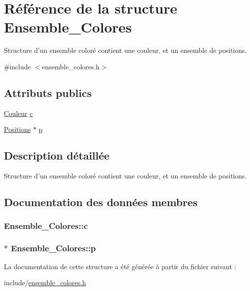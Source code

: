 \hypertarget{structEnsemble__Colores}{\section{\-Référence de la structure \-Ensemble\-\_\-\-Colores}
\label{structEnsemble__Colores}
}


\-Structure d'un ensemble coloré contient une couleur, et un ensemble de positions.  




{\ttfamily \#include $<$ensemble\-\_\-colores.\-h$>$}

\subsection*{\-Attributs publics}
\begin{DoxyCompactItemize}
\item 
\hyperlink{couleur_8h_aa304d0ca681f782b1d7735da33037dd7}{\-Couleur} \hyperlink{structEnsemble__Colores_ac6e238df5b4b896d72d3a54bceb3502b}{c}
\item 
\hyperlink{positions_8h_abfec3f4df359d071393d062f4aa9bf82}{\-Positions} $\ast$ \hyperlink{structEnsemble__Colores_ade944f566879fa1e8e29bd4eaad1cbe4}{p}
\end{DoxyCompactItemize}


\subsection{\-Description détaillée}
\-Structure d'un ensemble coloré contient une couleur, et un ensemble de positions. 

\subsection{\-Documentation des données membres}
\hypertarget{structEnsemble__Colores_ac6e238df5b4b896d72d3a54bceb3502b}{
\subsubsection[{c}]{ {\bf \-Ensemble\-\_\-\-Colores\-::c}}}\label{structEnsemble__Colores_ac6e238df5b4b896d72d3a54bceb3502b}
\hypertarget{structEnsemble__Colores_ade944f566879fa1e8e29bd4eaad1cbe4}{
\subsubsection[{p}]{$\ast$ {\bf \-Ensemble\-\_\-\-Colores\-::p}}}\label{structEnsemble__Colores_ade944f566879fa1e8e29bd4eaad1cbe4}


\-La documentation de cette structure a été générée à partir du fichier suivant \-:\begin{DoxyCompactItemize}
\item 
include/\hyperlink{ensemble__colores_8h}{ensemble\-\_\-colores.\-h}\end{DoxyCompactItemize}

